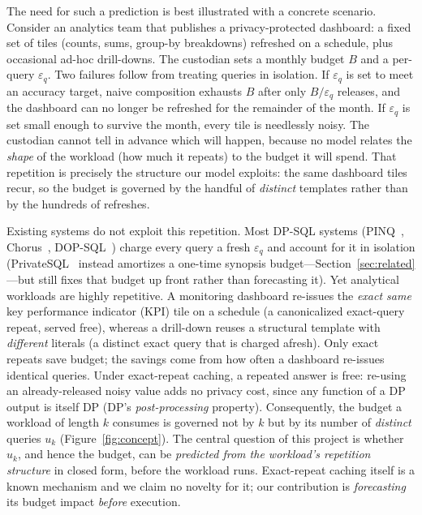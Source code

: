 \documentclass[sigconf,nonacm]{acmart}
\newcommand{\eps}{\varepsilon}
\begin{document}
The need for such a prediction is best illustrated with a concrete scenario. Consider an analytics team that publishes a privacy-protected dashboard: a fixed set of tiles (counts, sums, group-by breakdowns) refreshed on a schedule, plus occasional ad-hoc drill-downs. The custodian sets a monthly budget $B$ and a per-query $\eps_q$. Two failures follow from treating queries in isolation. If $\eps_q$ is set to meet an accuracy target, naive composition exhausts $B$ after only $B/\eps_q$ releases, and the dashboard can no longer be refreshed for the remainder of the month. If $\eps_q$ is set small enough to survive the month, every tile is needlessly noisy. The custodian cannot tell in advance which will happen, because no model relates the \emph{shape} of the workload (how much it repeats) to the budget it will spend. That repetition is precisely the structure our model exploits: the same dashboard tiles recur, so the budget is governed by the handful of \emph{distinct} templates rather than by the hundreds of refreshes.

Existing systems do not exploit this repetition. Most DP-SQL systems (PINQ~\cite{mcsherry2009privacy}, Chorus~\cite{johnson2020chorus}, DOP-SQL~\cite{yu2024dopsql}) charge every query a fresh $\eps_q$ and account for it in isolation (PrivateSQL~\cite{kotsogiannis2019privatesql} instead amortizes a one-time synopsis budget---Section~\ref{sec:related}---but still fixes that budget up front rather than forecasting it). Yet analytical workloads are highly repetitive. A monitoring dashboard re-issues the \emph{exact same} key performance indicator (KPI) tile on a schedule (a canonicalized exact-query repeat, served free), whereas a drill-down reuses a structural template with \emph{different} literals (a distinct exact query that is charged afresh). Only exact repeats save budget; the savings come from how often a dashboard re-issues identical queries. Under exact-repeat caching, a repeated answer is free: re-using an already-released noisy value adds no privacy cost, since any function of a DP output is itself DP (DP's \emph{post-processing} property). Consequently, the budget a workload of length $k$ consumes is governed not by $k$ but by its number of \emph{distinct} queries $u_k$ (Figure~\ref{fig:concept}). The central question of this project is whether $u_k$, and hence the budget, can be \emph{predicted from the workload's repetition structure} in closed form, before the workload runs. Exact-repeat caching itself is a known mechanism and we claim no novelty for it; our contribution is \emph{forecasting} its budget impact \emph{before} execution.
\end{document}
